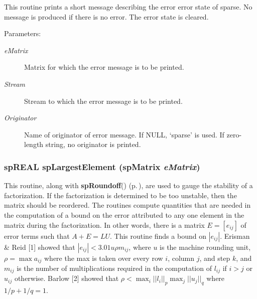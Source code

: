 This routine prints a short message describing the error error state of sparse. No message is produced if there is no error. The error state is cleared.\begin{Desc}
\item[Parameters: ]\par
\begin{description}
\item[{\em 
e\-Matrix}]Matrix for which the error message is to be printed. \item[{\em 
Stream}]Stream to which the error message is to be printed. \item[{\em 
Originator}]Name of originator of error message. If NULL, `sparse' is used. If zero-length string, no originator is printed. \end{description}
\end{Desc}
\subsubsection{\setlength{\rightskip}{0pt plus 5cm}sp\-REAL sp\-Largest\-Element ({\bf sp\-Matrix} {\em e\-Matrix})}\label{spUtils_8c_a22}


This routine, along with {\bf sp\-Roundoff}() {\rm (p.\,\pageref{spUtils_8c_a23})}, are used to gauge the stability of a factorization. If the factorization is determined to be too unstable, then the matrix should be reordered. The routines compute quantities that are needed in the computation of a bound on the error attributed to any one element in the matrix during the factorization. In other words, there is a matrix $ E = [e_{ij}] $ of error terms such that $ A+E = LU $. This routine finds a bound on $ |e_{ij}| $. Erisman \& Reid [1] showed that $ |e_{ij}| < 3.01 u \rho m_{ij} $, where $ u $ is the machine rounding unit, $ \rho = \max a_{ij} $ where the max is taken over every row $ i $, column $ j $, and step $ k $, and $ m_{ij} $ is the number of multiplications required in the computation of $ l_{ij} $ if $ i > j $ or $ u_{ij} $ otherwise. Barlow [2] showed that $ \rho < \max_i || l_i ||_p \max_j || u_j ||_q $ where $ 1/p + 1/q = 1 $.

